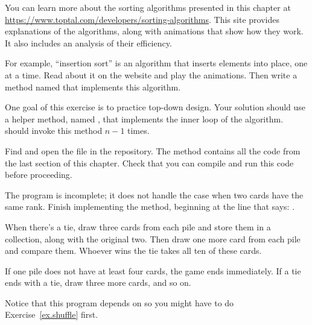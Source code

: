 \begin{exercise}

You can learn more about the sorting algorithms presented in this chapter at \url{https://www.toptal.com/developers/sorting-algorithms}.
This site provides explanations of the algorithms, along with animations that show how they work.
It also includes an analysis of their efficiency.

For example, ``insertion sort'' is an algorithm that inserts elements into place, one at a time.
Read about it on the website and play the animations.
Then write a method named  that implements this algorithm.

One goal of this exercise is to practice top-down design.
Your solution should use a helper method, named , that implements the inner loop of the algorithm.
 should invoke this method $n-1$ times.


\end{exercise}


\begin{exercise}  %


Find and open the file  in the repository.
The  method contains all the code from the last section of this chapter.
Check that you can compile and run this code before proceeding.

The program is incomplete; it does not handle the case when two cards have the same rank.
Finish implementing the  method, beginning at the line that says: .

When there's a tie, draw three cards from each pile and store them in a collection, along with the original two.
Then draw one more card from each pile and compare them.
Whoever wins the tie takes all ten of these cards.

If one pile does not have at least four cards, the game ends immediately.
If a tie ends with a tie, draw three more cards, and so on.

Notice that this program depends on  so you might have to do Exercise~\ref{ex.shuffle} first.

\end{exercise}

